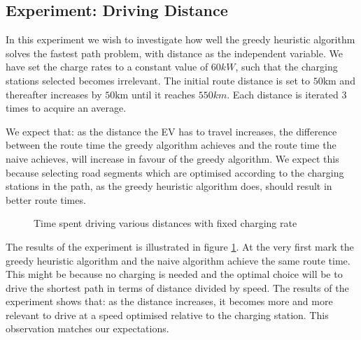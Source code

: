 \subsection{Experiment: Driving Distance}
In this experiment we wish to investigate how well the greedy heuristic algorithm solves the fastest path problem, with distance as the independent variable. We have set the charge rates to a constant value of $60 \si{kW}$, such that the charging stations selected becomes irrelevant. The initial route distance is set to $50 \si{\km}$ and thereafter increases by $50 \si{\km}$ until it reaches $550 \si{km}$. Each distance is iterated 3 times to acquire an average.

We expect that: as the distance the EV has to travel increases, the difference between the route time the greedy algorithm achieves and the route time the naive achieves, will increase in favour of the greedy algorithm. We expect this because selecting road segments which are optimised according to the charging stations in the path, as the greedy heuristic algorithm does, should result in better route times.

\begin{figure}[!htb]
\centering
{}
\caption{Time spent driving various distances with fixed charging rate} 
\label{fig:driving_dist}
\end{figure}

The results of the experiment is illustrated in figure \ref{fig:driving_dist}. At the very first mark the greedy heuristic algorithm and the naive algorithm achieve the same route time. This might be because no charging is needed and the optimal choice will be to drive the shortest path in terms of distance divided by speed. The results of the experiment shows that: as the distance increases, it becomes more and more relevant to drive at a speed optimised relative to the charging station. This observation matches our expectations.